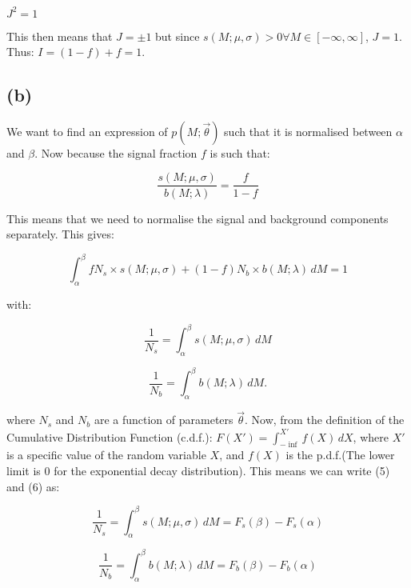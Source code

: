 \documentclass[12pt]{report} %
\begin{document}
$J^{2} = 1$ 

\vspace*{1\baselineskip}
This then means that $J = \pm 1$ but since $s(M;\mu,\sigma) > 0 \forall M \in [-\infty,\infty]$, $ J = 1$. Thus: $I = (1-f) + f = 1$.  


\subsection*{(b)}
We want to find an expression of $p(M;\vec{\theta})$ such that it is normalised between $\alpha$ and $\beta$. Now because the signal fraction $f$ is such that:

\begin{equation}
    \frac{s(M;\mu,\sigma)}{b(M;\lambda)} = \frac{f}{1-f}
\end{equation}

This means that we need to normalise the signal and background components separately. This gives:

\begin{equation}
    \displaystyle \int_{\alpha}^{\beta} f N_{s} \times s(M;\mu,\sigma) + (1 - f)N_{b} \times b(M;\lambda)\, dM = 1
\end{equation}  

with:

\begin{equation}
    \frac{1}{N_{s}} = \displaystyle \int_{\alpha}^{\beta} s(M;\mu,\sigma)\, dM
\end{equation}

\begin{equation}
    \frac{1}{N_{b}} = \displaystyle \int_{\alpha}^{\beta} b(M;\lambda)\, dM.
\end{equation}

\vspace*{1\baselineskip}
where $N_{s}$ and $N_{b}$ are a function of parameters $\vec{\theta}$. Now, from the definition of the Cumulative Distribution Function (c.d.f.): $F(X') = \int_{-\inf}^{X'} f(X)\, dX$, where $X'$ is a specific value of the random variable $X$, and $f(X)$ is the p.d.f.(The lower limit is 0 for the exponential decay distribution). This means we can write (5) and (6) as:

\begin{equation}
    \frac{1}{N_{s}} = \displaystyle \int_{\alpha}^{\beta} s(M;\mu,\sigma)\, dM = F_{s}(\beta) - F_{s}(\alpha)
\end{equation}

\begin{equation}
    \frac{1}{N_{b}} = \displaystyle \int_{\alpha}^{\beta} b(M;\lambda)\, dM = F_{b}(\beta) - F_{b}(\alpha)
\end{equation}
\end{document}
